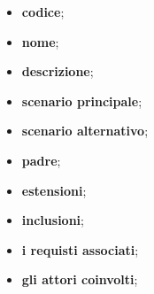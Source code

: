 \begin{itemize}
	\item \textbf{codice};
	\item \textbf{nome};
	\item \textbf{descrizione};
	\item \textbf{scenario principale};
	\item \textbf{scenario alternativo};
	\item \textbf{padre};
	\item \textbf{estensioni};
	\item \textbf{inclusioni};
	\item \textbf{i requisti associati};
	\item \textbf{gli attori coinvolti};
\end{itemize}

